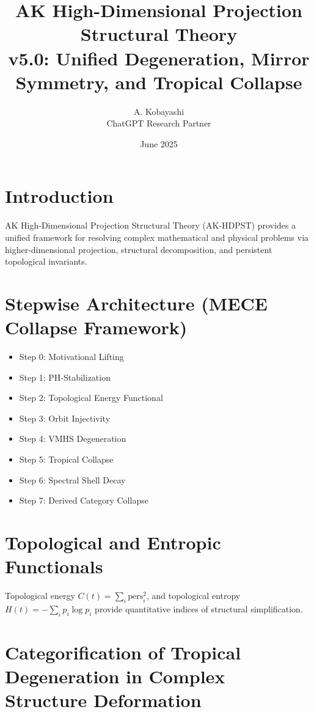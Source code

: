 \documentclass[11pt]{article}
\title{AK High-Dimensional Projection Structural Theory\\
\large v5.0: Unified Degeneration, Mirror Symmetry, and Tropical Collapse}
\author{A. Kobayashi \\ ChatGPT Research Partner}
\date{June 2025}
\begin{document}
\maketitle

\tableofcontents
\newpage


\section{Introduction}
AK High-Dimensional Projection Structural Theory (AK-HDPST) provides a unified framework for resolving complex mathematical and physical problems via higher-dimensional projection, structural decomposition, and persistent topological invariants.


\section{Stepwise Architecture (MECE Collapse Framework)}
\begin{itemize}
    \item Step 0: Motivational Lifting
    \item Step 1: PH-Stabilization
    \item Step 2: Topological Energy Functional
    \item Step 3: Orbit Injectivity
    \item Step 4: VMHS Degeneration
    \item Step 5: Tropical Collapse
    \item Step 6: Spectral Shell Decay
    \item Step 7: Derived Category Collapse
\end{itemize}


\section{Topological and Entropic Functionals}
Topological energy \( C(t) = \sum_i \text{pers}_i^2 \), and topological entropy \( H(t) = -\sum_i p_i \log p_i \) provide quantitative indices of structural simplification.


\section{Categorification of Tropical Degeneration in Complex Structure Deformation}
\end{document}
